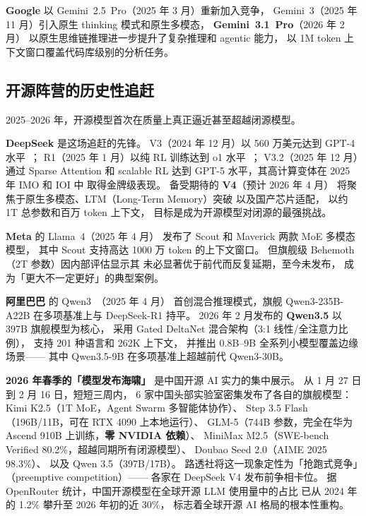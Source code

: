 \textbf{Google} 以 Gemini~2.5~Pro（2025 年 3 月）重新加入竞争，
Gemini~3（2025 年 11 月）引入原生 thinking 模式和原生多模态，
\textbf{Gemini~3.1~Pro}（2026 年 2 月）
以原生思维链推理进一步提升了复杂推理和 agentic 能力，
以 1M token 上下文窗口覆盖代码库级别的分析任务。

\subsection{开源阵营的历史性追赶}

2025--2026 年，开源模型首次在质量上真正逼近甚至超越闭源模型。

\textbf{DeepSeek} 是这场追赶的先锋。
V3（2024 年 12 月）以 560 万美元达到 GPT-4 水平~\cite{deepseekv3}；
R1（2025 年 1 月）以纯 RL 训练达到 o1 水平~\cite{deepseekr1}；
V3.2（2025 年 12 月）通过 Sparse Attention 和 scalable RL
达到 GPT-5 水平，其高计算变体在 2025 年 IMO 和 IOI 中
取得金牌级表现。
备受期待的 \textbf{V4}（预计 2026 年 4 月）
将聚焦于原生多模态、LTM（Long-Term Memory）突破
以及国产芯片适配，
以约 1T 总参数和百万 token 上下文，
目标是成为开源模型对闭源的最强挑战。

\textbf{Meta} 的 Llama~4（2025 年 4 月）
发布了 Scout 和 Maverick 两款 MoE 多模态模型，
其中 Scout 支持高达 1000 万 token 的上下文窗口。
但旗舰级 Behemoth（2T 参数）因内部评估显示其
未必显著优于前代而反复延期，至今未发布，
成为「更大不一定更好」的典型案例。

\textbf{阿里巴巴} 的 Qwen3~\cite{qwen2025qwen3}（2025 年 4 月）
首创混合推理模式，旗舰 Qwen3-235B-A22B 在多项基准上与 DeepSeek-R1 持平。
2026 年 2 月发布的 \textbf{Qwen3.5} 以 397B 旗舰模型为核心，
采用 Gated DeltaNet 混合架构（3:1 线性/全注意力比例），
支持 201 种语言和 262K 上下文，
并推出 0.8B--9B 全系列小模型覆盖边缘场景——
其中 Qwen3.5-9B 在多项基准上超越前代 Qwen3-30B。

\textbf{2026 年春季的「模型发布海啸」}
是中国开源 AI 实力的集中展示。
从 1 月 27 日到 2 月 16 日，短短三周内，
6 家中国头部实验室密集发布了各自的旗舰模型：
Kimi K2.5（1T MoE，Agent Swarm 多智能体协作）、
Step 3.5 Flash（196B/11B，可在 RTX 4090 上本地运行）、
GLM-5（744B 参数，完全在华为 Ascend 910B 上训练，\textbf{零 NVIDIA 依赖}）、
MiniMax M2.5（SWE-bench Verified 80.2\%，超越同期所有闭源模型）、
Doubao Seed 2.0（AIME 2025 98.3\%）、
以及 Qwen 3.5（397B/17B）。
路透社将这一现象定性为「抢跑式竞争」（preemptive competition）——
各家在 DeepSeek V4 发布前争相卡位。
据 OpenRouter 统计，中国开源模型在全球开源 LLM 使用量中的占比
已从 2024 年的 1.2\% 攀升至 2026 年初的近 30\%，
标志着全球开源 AI 格局的根本性重构。

